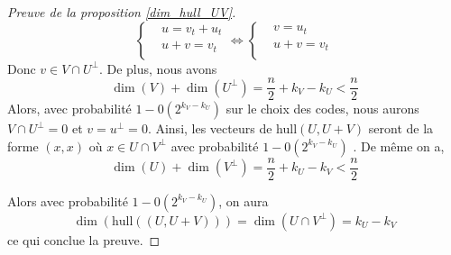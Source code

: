 \documentclass[12pt]{article}
\theoremstyle{plain}
\theoremstyle{definition}
\begin{document}
\begin{appendix}
\begin{proof}[Preuve de la proposition \ref{dim_hull_UV}]
\begin{equation*}
\left\{
\begin{aligned}
&u = v_t + u_t\\
&u + v = v_t\\
\end{aligned}
\right.
\iff
\left\{
\begin{aligned}
&v = u_t\\
&u + v = v_t\\
\end{aligned}
\right.
\end{equation*}
Donc $v\in V\cap U^{\bot}$.
De plus, nous avons $$\dim(V) + \dim(U^{\bot}) = \frac{n}{2} +k_V - k_U < \frac{n}{2}$$
Alors, avec probabilité $1-0(2^{k_V-k_U})$ sur le choix des codes, nous aurons $V \cap U^{\bot} = {0}$ et $v=u^{\bot} = 0$. Ainsi, les vecteurs de hull$(U,U+V)$ seront de la forme $(x,x)$ où $x \in U \cap V^{\bot}$ avec probabilité  $1-0(2^{k_V-k_U})$ .
De même on a,
$$\dim(U) + \dim(V^{\bot}) = \frac{n}{2} +k_U - k_V < \frac{n}{2}$$

Alors avec probabilité $1-0(2^{k_V-k_U})$, on aura 
$$\dim(\text{hull}((U,U+V))) = \dim(U\cap V^{\bot}) = k_U-k_V $$
ce qui conclue la preuve.
\end{proof}


\end{appendix}
\end{document}
